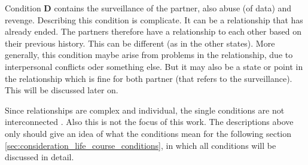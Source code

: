 Condition \textbf{D} contains the surveillance of the partner, also abuse (of data) and revenge. Describing this condition is complicate. 
It can be a relationship that has already ended. The partners therefore have a relationship to each other based on their previous history. This can be different (as in the other states). More generally, this condition maybe arise from problems in the relationship, due to interpersonal conflicts oder something else. But it may also be a state or point in the relationship which is fine for both partner (that refers to the surveillance). This will be discussed later on.

Since relationships are complex and individual, the single conditions are not interconnected \cite{sassler2010partnering}. Also this is not the focus of this work. The descriptions above only should give an idea of what the conditions mean for the following section \ref{sec:consideration_life_course_conditions}, in which all conditions will be discussed in detail.
